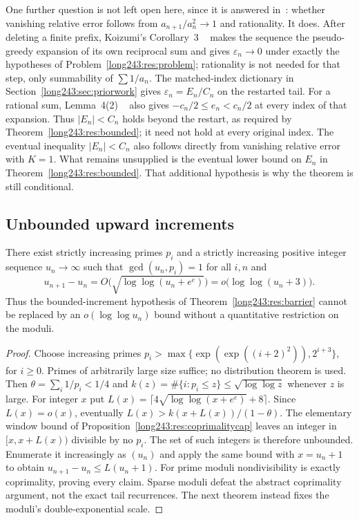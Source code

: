 \begin{remark}\label{long243:rem:relative-error-boundary}
One further question is not left open here, since it is answered
in~\cite{koizumi2025}: whether vanishing relative error follows from
$a_{n+1}/a_n^{2}\to1$ and rationality.  It does.  After
deleting a finite prefix, Koizumi's Corollary~3
~\cite[p.~9]{koizumi2025} makes the sequence the pseudo-greedy expansion of its
own reciprocal sum and gives $\varepsilon_n\to0$ under exactly the hypotheses of
Problem~\ref{long243:res:problem}; rationality is not needed for that step, only
summability of $\sum1/a_n$.  The matched-index dictionary in
Section~\ref{long243:sec:priorwork} gives $\varepsilon_n=E_n/C_n$
on the restarted tail. For a rational sum, Lemma~4(2)
~\cite[pp.~11--12]{koizumi2025} also gives
$-c_n/2\le e_n<c_n/2$ at every index of that expansion. Thus
$|E_n|<C_n$ holds beyond the restart, as required by
Theorem~\ref{long243:res:bounded}; it need not hold at every original
index. The eventual inequality $|E_n|<C_n$ also follows directly from vanishing
relative error with $K=1$. What remains unsupplied is the eventual
lower bound on $E_n$ in Theorem~\ref{long243:res:bounded}.
That additional hypothesis is why the theorem is still conditional.
\end{remark}

\subsection{Unbounded upward increments}

\begin{proposition}\label{long243:res:variablerise}
There exist strictly increasing primes $p_i$ and a strictly increasing
positive integer sequence $u_n\to\infty$ such that $\gcd(u_n,p_i)=1$ for
all $i,n$ and
\[
 u_{n+1}-u_n=O\bigl(\sqrt{\log\log(u_n+e^e)}\bigr)
             =o\bigl(\log\log(u_n+3)\bigr).
\]
Thus the bounded-increment hypothesis of
Theorem~\ref{long243:res:barrier} cannot be replaced by an
$o(\log\log u_n)$ bound without a quantitative restriction on the
moduli.
\end{proposition}

\begin{proof}
Choose increasing primes
$p_i>\max\{\exp(\exp((i+2)^2)),2^{i+3}\}$, for $i\ge0$.
Primes of arbitrarily large size suffice; no distribution theorem is used.
Then $\theta=\sum_i1/p_i<1/4$ and
$k(z)=\#\{i:p_i\le z\}\le\sqrt{\log\log z}$ whenever $z$ is large.
For integer $x$ put
$L(x)=\lceil4\sqrt{\log\log(x+e^e)}+8\rceil$.
Since $L(x)=o(x)$, eventually $L(x)>k(x+L(x))/(1-\theta)$.
The elementary window bound of
Proposition~\ref{long243:res:coprimalitycap} leaves an integer in
$[x,x+L(x))$ divisible by no $p_i$. The set of such integers is therefore
unbounded. Enumerate it increasingly as $(u_n)$ and apply the same bound
with $x=u_n+1$ to obtain $u_{n+1}-u_n\le L(u_n+1)$.
For prime moduli nondivisibility is exactly coprimality, proving every
claim. Sparse moduli defeat the abstract coprimality argument, not the exact
tail recurrences. The next theorem instead fixes the moduli's
double-exponential scale.
\end{proof}

